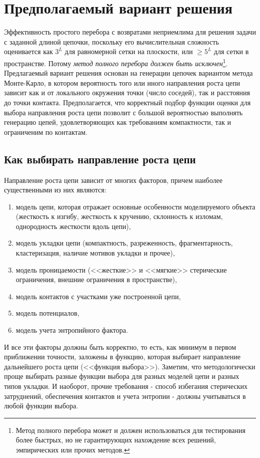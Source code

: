 \documentclass[tikz,a4paper]{scrartcl} %
\begin{document}
\section*{Предполагаемый вариант решения}
Эффективность простого перебора с возвратами неприемлима для решения задачи с заданной длиной цепочки, поскольку его вычислительная сложность оценивается как $3^L$ для равномерной сетки на плоскости, или $\geq 5^L$ для сетки в пространстве. Потому \textit{метод полного перебора должен быть исключен}\footnote{Метод полного перебора может и должен использоваться для тестирования более быстрых, но не гарантирующих нахождение всех решений, эмпирических или прочих методов.}. Предлагаемый вариант решения основан на генерации цепочек вариантом метода Монте-Карло, в котором вероятность того или иного направления роста цепи зависит как и от локального окружения точки (число соседей), так и расстояния до точки контакта. Предполагается, что корректный подбор функции оценки для выбора направления роста цепи позволит с большой вероятностью выполнять генерацию цепей, удовлетворяющих как требованиям компактности, так и ограниченим по контактам.

\subsection*{Как выбирать направление роста цепи}
Направление роста цепи зависит от многих факторов, причем наиболее существенными из них являются:
\begin{enumerate}
\item модель цепи, которая отражает основные особенности моделируемого объекта (жесткость к изгибу, жесткость к кручению, склонность к изломам, однородность жесткости вдоль цепи), 
\item модель укладки цепи (компактность, разреженность, фрагментарность,  кластеризация, наличие мотивов укладки и прочее), 
\item модель проницаемости (<<жесткие>> и <<мягкие>> стерические ограничения, внешние ограничения в пространстве), 
\item модель контактов с участками уже построенной цепи,
\item модель потенциалов,
\item модель учета энтропийного фактора.
\end{enumerate}
И все эти факторы должны быть корректно, то есть, как минимум в первом приближении точности, заложены в функцию, которая выбирает направление дальнейшего роста цепи (<<функция выбора>>). Заметим, что методологически проще выбирать разные функции выбора для разных моделей цепи и разных типов укладки. И наоборот, прочие требования - способ избегания стерических затруднений, обеспечения контактов и учета энтропии - должны учитываться в любой функции выбора. 
\end{document}
